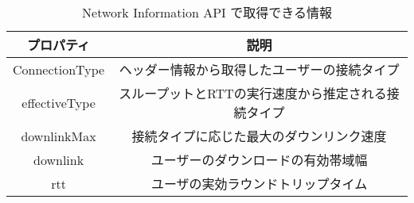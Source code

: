 \begin{table}[htbp]
    \centering
    \caption{Network Information API で取得できる情報}
    \begin{tabular}{cc}
        \hline
        プロパティ & 説明 \\
        \hline \hline
        ConnectionType & ヘッダー情報から取得したユーザーの接続タイプ \\
        effectiveType & スループットとRTTの実行速度から推定される接続タイプ \\
        downlinkMax & 接続タイプに応じた最大のダウンリンク速度 \\
        downlink & ユーザーのダウンロードの有効帯域幅 \\
        rtt & ユーザの実効ラウンドトリップタイム \\
        \hline
    \end{tabular}
    \label{tab:networkinfo}
\end{table}
\FloatBarrier
